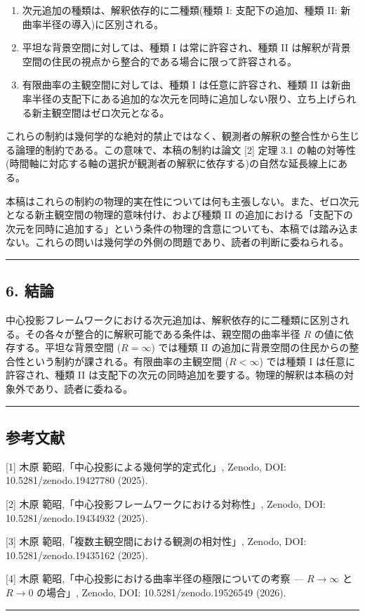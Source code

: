 \documentclass[a4paper,11pt]{ltjsarticle}
\theoremstyle{definition}
\providecommand{\tightlist}{\setlength{\itemsep}{0pt}\setlength{\parskip}{0pt}}
\begin{document}
\begin{enumerate}
\def\labelenumi{\arabic{enumi}.}
\tightlist
\item
  次元追加の種類は、解釈依存的に二種類(種類 I: 支配下の追加、種類 II: 新曲率半径の導入)に区別される。
\item
  平坦な背景空間に対しては、種類 I は常に許容され、種類 II は解釈が背景空間の住民の視点から整合的である場合に限って許容される。
\item
  有限曲率の主観空間に対しては、種類 I は任意に許容され、種類 II は新曲率半径の支配下にある追加的な次元を同時に追加しない限り、立ち上げられる新主観空間はゼロ次元となる。
\end{enumerate}

これらの制約は幾何学的な絶対的禁止ではなく、観測者の解釈の整合性から生じる論理的制約である。この意味で、本稿の制約は論文 {[}2{]} 定理 3.1 の軸の対等性(時間軸に対応する軸の選択が観測者の解釈に依存する)の自然な延長線上にある。

本稿はこれらの制約の物理的実在性については何も主張しない。また、ゼロ次元となる新主観空間の物理的意味付け、および種類 II の追加における「支配下の次元を同時に追加する」という条件の物理的含意についても、本稿では踏み込まない。これらの問いは幾何学の外側の問題であり、読者の判断に委ねられる。

\begin{center}\rule{0.5\linewidth}{0.5pt}\end{center}

\subsection{6. 結論}\label{ux7d50ux8ad6}

中心投影フレームワークにおける次元追加は、解釈依存的に二種類に区別される。その各々が整合的に解釈可能である条件は、親空間の曲率半径 \(R\) の値に依存する。平坦な背景空間 (\(R = \infty\)) では種類 II の追加に背景空間の住民からの整合性という制約が課される。有限曲率の主観空間 (\(R < \infty\)) では種類 I は任意に許容され、種類 II は支配下の次元の同時追加を要する。物理的解釈は本稿の対象外であり、読者に委ねる。

\begin{center}\rule{0.5\linewidth}{0.5pt}\end{center}

\subsection{参考文献}\label{ux53c2ux8003ux6587ux732e}

{[}1{]} 木原 範昭,「中心投影による幾何学的定式化」, Zenodo, DOI: 10.5281/zenodo.19427780 (2025).

{[}2{]} 木原 範昭,「中心投影フレームワークにおける対称性」, Zenodo, DOI: 10.5281/zenodo.19434932 (2025).

{[}3{]} 木原 範昭,「複数主観空間における観測の相対性」, Zenodo, DOI: 10.5281/zenodo.19435162 (2025).

{[}4{]} 木原 範昭,「中心投影における曲率半径の極限についての考察 --- \(R \to \infty\) と \(R \to 0\) の場合」, Zenodo, DOI: 10.5281/zenodo.19526549 (2026).

\begin{center}\rule{0.5\linewidth}{0.5pt}\end{center}
\end{document}
